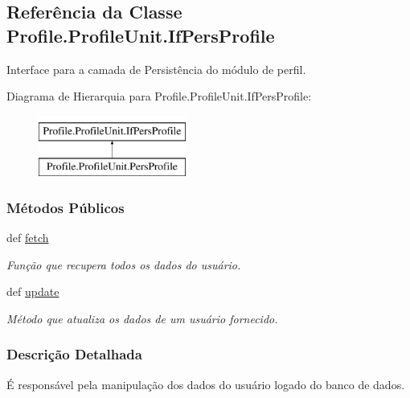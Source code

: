 \hypertarget{classProfile_1_1ProfileUnit_1_1IfPersProfile}{\subsection{Referência da Classe Profile.\-Profile\-Unit.\-If\-Pers\-Profile}
\label{classProfile_1_1ProfileUnit_1_1IfPersProfile}
}


Interface para a camada de Persistência do módulo de perfil.  


Diagrama de Hierarquia para Profile.\-Profile\-Unit.\-If\-Pers\-Profile\-:\begin{figure}[H]
\begin{center}
\leavevmode
\includegraphics[height=2.000000cm]{d2/dec/classProfile_1_1ProfileUnit_1_1IfPersProfile}
\end{center}
\end{figure}
\subsubsection*{Métodos Públicos}
\begin{DoxyCompactItemize}
\item 
def \hyperlink{classProfile_1_1ProfileUnit_1_1IfPersProfile_a64821aed51d9e9d64f6da9ee9b20fdeb}{fetch}
\begin{DoxyCompactList}\small\item\em Função que recupera todos os dados do usuário. \end{DoxyCompactList}\item 
def \hyperlink{classProfile_1_1ProfileUnit_1_1IfPersProfile_ae2d65e1ead2780de7b97fab078bb425e}{update}
\begin{DoxyCompactList}\small\item\em Método que atualiza os dados de um usuário fornecido. \end{DoxyCompactList}\end{DoxyCompactItemize}


\subsubsection{Descrição Detalhada}
É responsável pela manipulação dos dados do usuário logado do banco de dados. 

